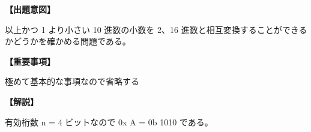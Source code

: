 \noindent \textbf{【出題意図】}

 以上かつ 1 より小さい 10 進数の小数を 2、16 進数と相互変換することができるかどうかを確かめる問題である。

\vspace{1em}
\noindent \textbf{【重要事項】}

\noindent 極めて基本的な事項なので省略する

\vspace{1em}
\noindent \textbf{【解説】}

\noindent 有効桁数 n = 4 ビットなので 0x A = 0b 1010 である。
